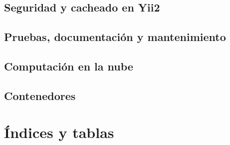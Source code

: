 \documentclass[a4paper,12pt,spanish]{sphinxmanual}
\begin{document}
\chapter{Seguridad y cacheado en Yii2}
\label{\detokenize{yii2:seguridad-y-cacheado-en-yii2}}

\chapter{Pruebas, documentación y mantenimiento}
\label{\detokenize{yii2:pruebas-documentacion-y-mantenimiento}}

\chapter{Computación en la nube}
\label{\detokenize{yii2:computacion-en-la-nube}}

\chapter{Contenedores}
\label{\detokenize{yii2:contenedores}}

\part{Índices y tablas}
\label{\detokenize{index_latex:indices-y-tablas}}


\renewcommand{\indexname}{Índice}
\printindex
\end{document}
